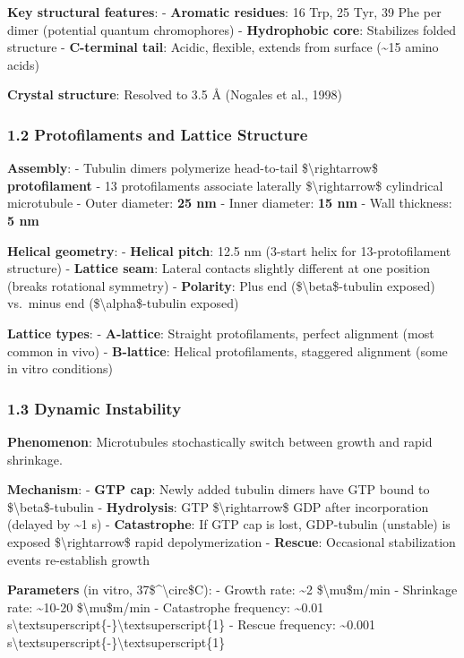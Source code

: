 \textbf{Key structural features}: - \textbf{Aromatic residues}: 16 Trp,
25 Tyr, 39 Phe per dimer (potential quantum chromophores) -
\textbf{Hydrophobic core}: Stabilizes folded structure -
\textbf{C-terminal tail}: Acidic, flexible, extends from surface
(\textasciitilde15 amino acids)

\textbf{Crystal structure}: Resolved to 3.5 Å (Nogales et al., 1998)

\subsubsection{1.2 Protofilaments and Lattice
Structure}\label{protofilaments-and-lattice-structure}

\textbf{Assembly}: - Tubulin dimers polymerize head-to-tail
\$\textbackslash rightarrow\$ \textbf{protofilament} - 13 protofilaments
associate laterally \$\textbackslash rightarrow\$ cylindrical
microtubule - Outer diameter: \textbf{25 nm} - Inner diameter:
\textbf{15 nm} - Wall thickness: \textbf{5 nm}

\textbf{Helical geometry}: - \textbf{Helical pitch}: 12.5 nm (3-start
helix for 13-protofilament structure) - \textbf{Lattice seam}: Lateral
contacts slightly different at one position (breaks rotational symmetry)
- \textbf{Polarity}: Plus end (\$\textbackslash beta\$-tubulin exposed)
vs.~minus end (\$\textbackslash alpha\$-tubulin exposed)

\textbf{Lattice types}: - \textbf{A-lattice}: Straight protofilaments,
perfect alignment (most common in vivo) - \textbf{B-lattice}: Helical
protofilaments, staggered alignment (some in vitro conditions)

\subsubsection{1.3 Dynamic Instability}\label{dynamic-instability}

\textbf{Phenomenon}: Microtubules stochastically switch between growth
and rapid shrinkage.

\textbf{Mechanism}: - \textbf{GTP cap}: Newly added tubulin dimers have
GTP bound to \$\textbackslash beta\$-tubulin - \textbf{Hydrolysis}: GTP
\$\textbackslash rightarrow\$ GDP after incorporation (delayed by
\textasciitilde1 s) - \textbf{Catastrophe}: If GTP cap is lost,
GDP-tubulin (unstable) is exposed \$\textbackslash rightarrow\$ rapid
depolymerization - \textbf{Rescue}: Occasional stabilization events
re-establish growth

\textbf{Parameters} (in vitro, 37\$\^{}\textbackslash circ\$C): - Growth
rate: \textasciitilde2 \$\textbackslash mu\$m/min - Shrinkage rate:
\textasciitilde10-20 \$\textbackslash mu\$m/min - Catastrophe frequency:
\textasciitilde0.01
s\textbackslash textsuperscript\{-\}\textbackslash textsuperscript\{1\}
- Rescue frequency: \textasciitilde0.001
s\textbackslash textsuperscript\{-\}\textbackslash textsuperscript\{1\}

